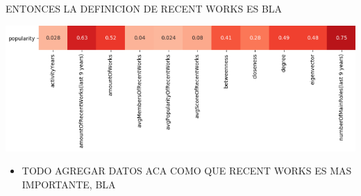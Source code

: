 \begin{frame}
ENTONCES LA DEFINICION DE RECENT WORKS ES BLA
\begin{center}
\includegraphics[scale=0.45]{graphics/popCorrelationRecentWorks.png} 
\end{center}
\begin{itemize}
\item TODO AGREGAR DATOS ACA COMO QUE RECENT WORKS ES MAS IMPORTANTE, BLA
\end{itemize}
\end{frame}


